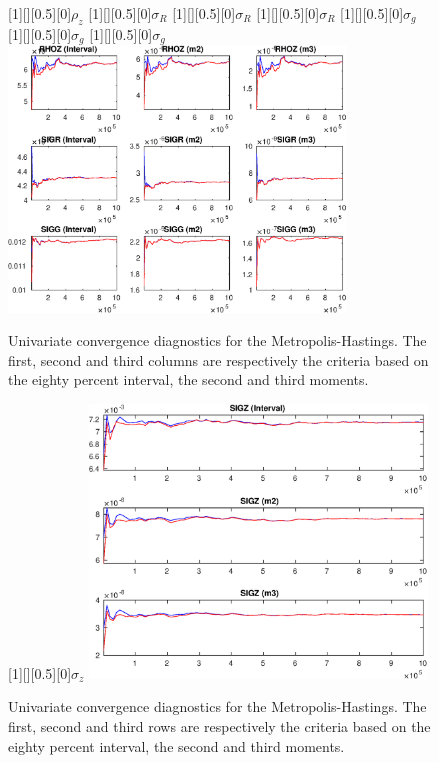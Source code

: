 \begin{figure}[H]
[1][][0.5][0]{$ {\rho_z} $}
[1][][0.5][0]{$ {\sigma_R} $}
[1][][0.5][0]{$ {\sigma_R} $}
[1][][0.5][0]{$ {\sigma_R} $}
[1][][0.5][0]{$ {\sigma_{g}} $}
[1][][0.5][0]{$ {\sigma_{g}} $}
[1][][0.5][0]{$ {\sigma_{g}} $}
\centering 
\includegraphics[width=0.80\textwidth]{AnSchoModTheBuilder/Output/AnSchoModTheBuilder_udiag4}
\caption{Univariate convergence diagnostics for the Metropolis-Hastings.
The first, second and third columns are respectively the criteria based on
the eighty percent interval, the second and third moments.}\label{Fig:UnivariateDiagnostics:4}
\end{figure}

\begin{figure}[H]
[1][][0.5][0]{$ {\sigma_z} $}
\centering 
\includegraphics[width=0.80\textwidth]{AnSchoModTheBuilder/Output/AnSchoModTheBuilder_udiag5}
\caption{Univariate convergence diagnostics for the Metropolis-Hastings.
The first, second and third rows are respectively the criteria based on
the eighty percent interval, the second and third moments.}\label{Fig:UnivariateDiagnostics:5}
\end{figure}

